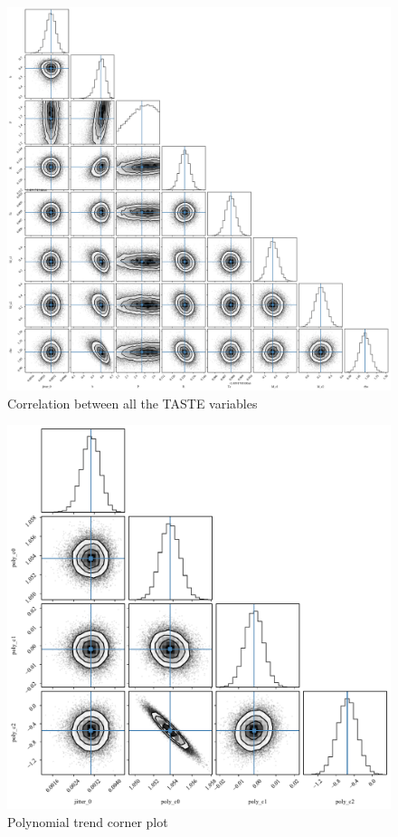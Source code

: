 \documentclass[a4paper,11pt,twocolumn]{article}
\begin{document}
\begin{figure}
  \centering
    \includegraphics[scale=0.2, angle=0]{../pictures/taste/acf_taste.pdf}
    \caption{Correlation between all the TASTE variables}
   \label{fig: cptaste}
\end{figure}


\begin{figure}
  \centering
    \includegraphics[scale=0.3, angle=0]{../pictures/taste/poly.pdf}
    \caption{Polynomial trend corner plot}
   \label{fig: ptrend}
\end{figure}
\end{document}
